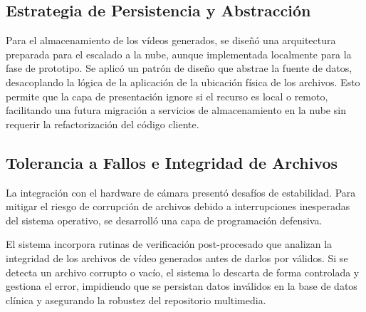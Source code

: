 \subsection{Estrategia de Persistencia y Abstracción}

Para el almacenamiento de los vídeos generados, se diseñó una arquitectura preparada para el escalado a la nube, aunque implementada localmente para la fase de prototipo. Se aplicó un patrón de diseño que abstrae la fuente de datos, desacoplando la lógica de la aplicación de la ubicación física de los archivos. Esto permite que la capa de presentación ignore si el recurso es local o remoto, facilitando una futura migración a servicios de almacenamiento en la nube sin requerir la refactorización del código cliente.

\subsection{Tolerancia a Fallos e Integridad de Archivos}

La integración con el hardware de cámara presentó desafíos de estabilidad. Para mitigar el riesgo de corrupción de archivos debido a interrupciones inesperadas del sistema operativo, se desarrolló una capa de programación defensiva.

El sistema incorpora rutinas de verificación post-procesado que analizan la integridad de los archivos de vídeo generados antes de darlos por válidos. Si se detecta un archivo corrupto o vacío, el sistema lo descarta de forma controlada y gestiona el error, impidiendo que se persistan datos inválidos en la base de datos clínica y asegurando la robustez del repositorio multimedia.